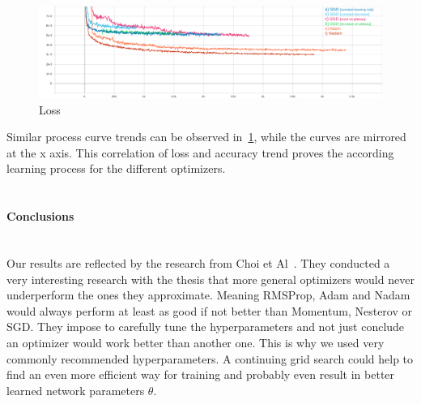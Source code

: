 

\begin{figure}[H]
    \centering
    \includegraphics[width=\textwidth,height=\textheight,keepaspectratio]{img/loss_all.png}
    \decoRule
    \caption[loss]{Loss}
    \label{fig:loss}
\end{figure}
Similar process curve trends can be observed in~\ref{fig:loss}, while the curves are mirrored at the x axis.
This correlation of loss and accuracy trend proves the according learning process for the different optimizers.
\\\mbox{}\\
\paragraph{Conclusions}\mbox{}\\
Our results are reflected by the research from Choi et Al~\cite{empiricaloptimizers}.
They conducted a very interesting research with the thesis that more general optimizers would never underperform
the ones they approximate.
Meaning RMSProp, Adam and Nadam would always perform at least as good if not better than Momentum, Nesterov or SGD.
They impose to carefully tune the hyperparameters and not just conclude an optimizer would work better than another one.
This is why we used very commonly recommended hyperparameters.
A continuing grid search could help to find an even more efficient way for training and probably even result in better
learned network parameters $\theta$.





